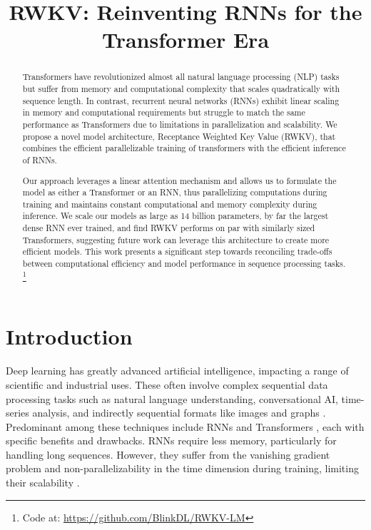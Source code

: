 \title{RWKV: Reinventing RNNs for the Transformer Era}

\begin{abstract}
\label{abstract}
Transformers have revolutionized almost all natural language processing (NLP) tasks but suffer from memory and computational complexity that scales quadratically with sequence length. In contrast, recurrent neural networks (RNNs) exhibit linear scaling in memory and computational requirements but struggle to match the same performance as Transformers due to limitations in parallelization and scalability. We propose a novel model architecture, Receptance Weighted Key Value (RWKV), that combines the efficient parallelizable training of transformers with the efficient inference of RNNs.

Our approach leverages a linear attention mechanism and allows us to formulate the model as either a Transformer or an RNN, thus parallelizing computations during training and maintains constant computational and memory complexity during inference. We scale our models as large as 14 billion parameters, by far the largest dense RNN ever trained, and find RWKV performs on par with similarly sized Transformers, suggesting future work can leverage this architecture to create more efficient models. This work presents a significant step towards reconciling trade-offs between computational efficiency and model performance in sequence processing tasks.
\footnote{Code at: \href{https://github.com/BlinkDL/RWKV-LM}{https://github.com/BlinkDL/RWKV-LM}}
\end{abstract}

\section{Introduction} \label{introduction}
Deep learning has greatly advanced artificial intelligence, impacting a range of scientific and industrial uses. These often involve complex sequential data processing tasks such as natural language understanding, conversational AI, time-series analysis, and indirectly sequential formats like images and graphs \cite{brown2020language, ismail2019deep, wu2020comprehensive,albalak-etal-2022-feta}. Predominant among these techniques include RNNs and Transformers \cite{vaswani2017attention}, each with specific benefits and drawbacks. RNNs require less memory, particularly for handling long sequences.  However, they suffer from the vanishing gradient problem and non-parallelizability in the time dimension during training, limiting their scalability \cite{hochreiter1998vanishing,le2016quantifying}. 

